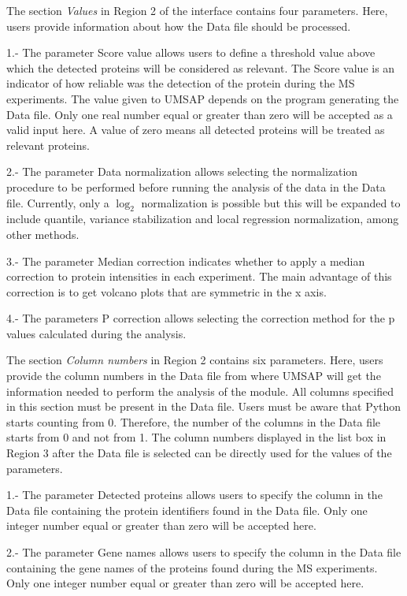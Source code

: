 The section \textit{Values} in Region \num{2} of the interface contains four parameters. Here, users provide information about how the Data file should be processed.

\num{1}.- The parameter Score value\label{par:protprofScoreValue} allows users to define a threshold value above which the detected proteins will be considered as relevant. The Score value is an indicator of how reliable was the detection of the protein during the MS experiments. The value given to UMSAP depends on the program generating the Data file. Only one real number equal or greater than zero will be accepted as a valid input here. A value of zero means all detected proteins will be treated as relevant proteins.

\num{2}.-  The parameter Data normalization allows selecting the normalization procedure to be performed before running the analysis of the data in the Data file. Currently, only a $\log_2$ normalization is possible but this will be expanded to include quantile, variance stabilization and local regression normalization, among other methods. 

\num{3}.- The parameter Median correction indicates whether to apply a median correction to protein intensities in each experiment. The main advantage of this correction is to get volcano plots that are symmetric in the x axis.

\num{4}.- The parameters P correction allows selecting the correction method for the p values calculated during the analysis. 

The section \textit{Column numbers} in Region \num{2} contains six parameters. Here, users provide the column numbers in the Data file from where UMSAP will get the information needed to perform the analysis of the module. All columns specified in this section must be present in the Data file. Users must be aware that Python starts counting from \num{0}. Therefore, the number of the columns in the Data file starts from \num{0} and not from \num{1}. The column numbers displayed in the list box in Region \num{3} after the Data file is selected can be directly used for the values of the parameters. 

\num{1}.- The parameter Detected proteins allows users to specify the column in the Data file containing the protein identifiers found in the Data file. Only one integer number equal or greater than zero will be accepted here. 

\num{2}.- The parameter Gene names allows users to specify the column in the Data file containing the gene names of the proteins found during the MS experiments. Only one integer number equal or greater than zero will be accepted here. 

